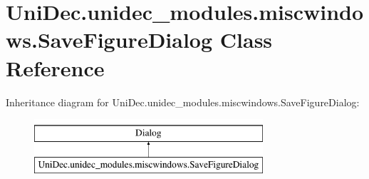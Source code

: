 \hypertarget{class_uni_dec_1_1unidec__modules_1_1miscwindows_1_1_save_figure_dialog}{}\section{Uni\+Dec.\+unidec\+\_\+modules.\+miscwindows.\+Save\+Figure\+Dialog Class Reference}
\label{class_uni_dec_1_1unidec__modules_1_1miscwindows_1_1_save_figure_dialog}
Inheritance diagram for Uni\+Dec.\+unidec\+\_\+modules.\+miscwindows.\+Save\+Figure\+Dialog\+:\begin{figure}[H]
\begin{center}
\leavevmode
\includegraphics[height=2.000000cm]{class_uni_dec_1_1unidec__modules_1_1miscwindows_1_1_save_figure_dialog}
\end{center}
\end{figure}
